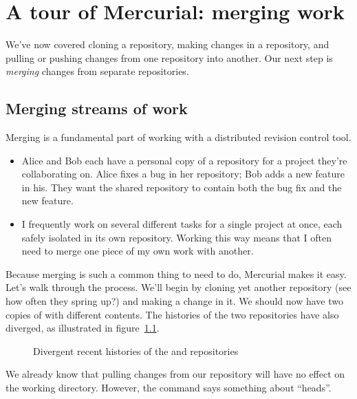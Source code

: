 \chapter{A tour of Mercurial: merging work}
\label{chap:tour-merge}

We've now covered cloning a repository, making changes in a
repository, and pulling or pushing changes from one repository into
another.  Our next step is \emph{merging} changes from separate
repositories.

\section{Merging streams of work}

Merging is a fundamental part of working with a distributed revision
control tool.
\begin{itemize}
\item Alice and Bob each have a personal copy of a repository for a
  project they're collaborating on.  Alice fixes a bug in her
  repository; Bob adds a new feature in his.  They want the shared
  repository to contain both the bug fix and the new feature.
\item I frequently work on several different tasks for a single
  project at once, each safely isolated in its own repository.
  Working this way means that I often need to merge one piece of my
  own work with another.
\end{itemize}

Because merging is such a common thing to need to do, Mercurial makes
it easy.  Let's walk through the process.  We'll begin by cloning yet
another repository (see how often they spring up?) and making a change
in it.
We should now have two copies of  with different
contents.  The histories of the two repositories have also diverged,
as illustrated in figure~\ref{fig:tour-merge:sep-repos}.

\begin{figure}[ht]
  \centering
  \caption{Divergent recent histories of the  and
     repositories}
  \label{fig:tour-merge:sep-repos}
\end{figure}

We already know that pulling changes from our 
repository will have no effect on the working directory.
However, the  command says something about ``heads''.  

